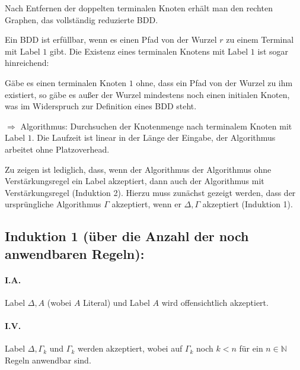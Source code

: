 Nach Entfernen der doppelten terminalen Knoten erhält man den rechten Graphen, das vollständig reduzierte BDD.


Ein BDD ist erfüllbar, wenn es einen Pfad von der Wurzel $r$ zu einem Terminal mit Label $1$ gibt. Die Existenz eines
terminalen Knotens mit Label $1$ ist sogar hinreichend:

Gäbe es einen terminalen Knoten $1$ ohne, dass ein Pfad von der Wurzel zu ihm existiert, so gäbe es außer der Wurzel
mindestens noch einen initialen Knoten, was im Widerspruch zur Definition eines BDD steht.

$\Rightarrow$ Algorithmus: Durchsuchen der Knotenmenge nach terminalem Knoten mit Label $1$. Die Laufzeit ist linear in
der Länge der Eingabe, der Algorithmus arbeitet ohne Platzoverhead.


Zu zeigen ist lediglich, dass, wenn der Algorithmus der Algorithmus ohne Verstärkungsregel ein Label akzeptiert, dann
auch der Algorithmus mit Verstärkungsregel (Induktion 2). Hierzu muss zunächst gezeigt werden, dass der ursprüngliche Algorithmus
$\Gamma$ akzeptiert, wenn er $\Delta, \Gamma$ akzeptiert (Induktion 1).

\subsection*{Induktion 1 (über die Anzahl der noch anwendbaren Regeln):}
\paragraph{I.A.} Label $\Delta, A$ (wobei $A$ Literal) und Label $A$ wird offensichtlich akzeptiert.
\paragraph{I.V.} Label $\Delta, \Gamma_k$ und $\Gamma_k$ werden akzeptiert, wobei auf $\Gamma_k$ noch $k < n$ für ein $n
\in \mathbb{N}$ Regeln anwendbar sind.
